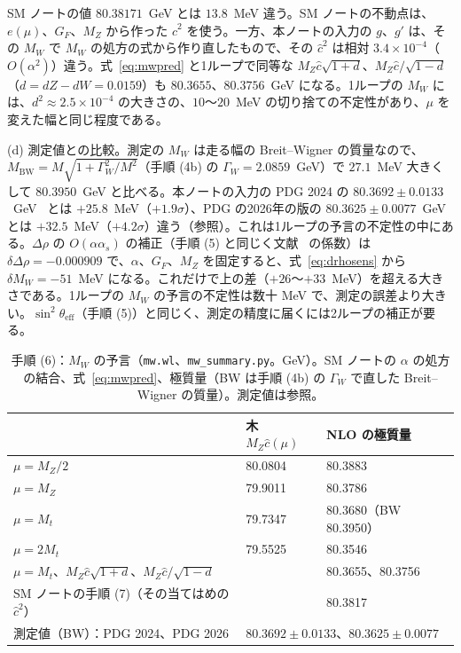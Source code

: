 \documentclass[a4paper,10pt]{ltjsarticle}
\begin{document}
SM ノートの値 $80.38171$~GeV とは $13.8$~MeV 違う。SM ノートの不動点は、$e(\mu)$、$G_F$、$M_Z$ から作った $\hat c^2$ を使う。一方、本ノートの入力の $g$、$g'$ は、その $M_W$ で $M_W$ の処方の式から作り直したもので、その $\hat c^2$ は相対 $3.4\times10^{-4}$（$O(\alpha^2)$）違う。式~\eqref{eq:mwpred} と1ループで同等な $M_Z\hat c\sqrt{1+d}$、$M_Z\hat c/\sqrt{1-d}$（$d=dZ-dW=0.0159$）も $80.3655$、$80.3756$~GeV になる。1ループの $M_W$ には、$d^2\approx2.5\times10^{-4}$ の大きさの、$10$〜$20$~MeV の切り捨ての不定性があり、$\mu$ を変えた幅と同じ程度である。

(d) 測定値との比較。測定の $M_W$ は走る幅の Breit--Wigner の質量なので、$M_{\mathrm{BW}}=M\sqrt{1+\Gamma_W^2/M^2}$（手順 (4b) の $\Gamma_W=2.0859$~GeV）で $27.1$~MeV 大きくして $80.3950$~GeV と比べる。本ノートの入力の PDG 2024 の $80.3692\pm0.0133$~GeV~\cite{pdg24} とは $+25.8$~MeV（$+1.9\sigma$）、PDG の2026年の版の $80.3625\pm0.0077$~GeV~\cite{pdg26} とは $+32.5$~MeV（$+4.2\sigma$）違う（参照）。これは1ループの予言の不定性の中にある。$\Delta\rho$ の $O(\alpha\alpha_s)$ の補正（手順 (5) と同じく文献~\cite{dv87} の係数）は $\delta\Delta\rho=-0.000909$ で、$\alpha$、$G_F$、$M_Z$ を固定すると、式~\eqref{eq:drhosens} から $\delta M_W=-51$~MeV になる。これだけで上の差（$+26$〜$+33$~MeV）を超える大きさである。1ループの $M_W$ の予言の不定性は数十 MeV で、測定の誤差より大きい。$\sin^2\theta_{\mathrm{eff}}$（手順 (5)）と同じく、測定の精度に届くには2ループの補正が要る。

\begin{table}[tbp]
\centering\small
\caption{手順 (6)：$M_W$ の予言（\texttt{mw.wl}、\texttt{mw\_summary.py}。GeV）。SM ノートの $\alpha$ の処方の結合、式~\eqref{eq:mwpred}、極質量（BW は手順 (4b) の $\Gamma_W$ で直した Breit--Wigner の質量）。測定値は参照。}
\label{tab:mw}
\begin{tabular}{lll}
\toprule
 & 木 $M_Z\hat c(\mu)$ & NLO の極質量 \\
\midrule
$\mu=M_Z/2$ & 80.0804 & 80.3883 \\
$\mu=M_Z$ & 79.9011 & 80.3786 \\
$\mu=M_t$ & 79.7347 & 80.3680（BW 80.3950） \\
$\mu=2M_t$ & 79.5525 & 80.3546 \\
\midrule
$\mu=M_t$、$M_Z\hat c\sqrt{1+d}$、$M_Z\hat c/\sqrt{1-d}$ & & 80.3655、80.3756 \\
SM ノートの手順 (7)（その当てはめの $\hat c^2$） & & 80.3817 \\
\midrule
測定値（BW）：PDG 2024、PDG 2026 & \multicolumn{2}{l}{$80.3692\pm0.0133$、$80.3625\pm0.0077$} \\
\bottomrule
\end{tabular}
\end{table}
\end{document}
